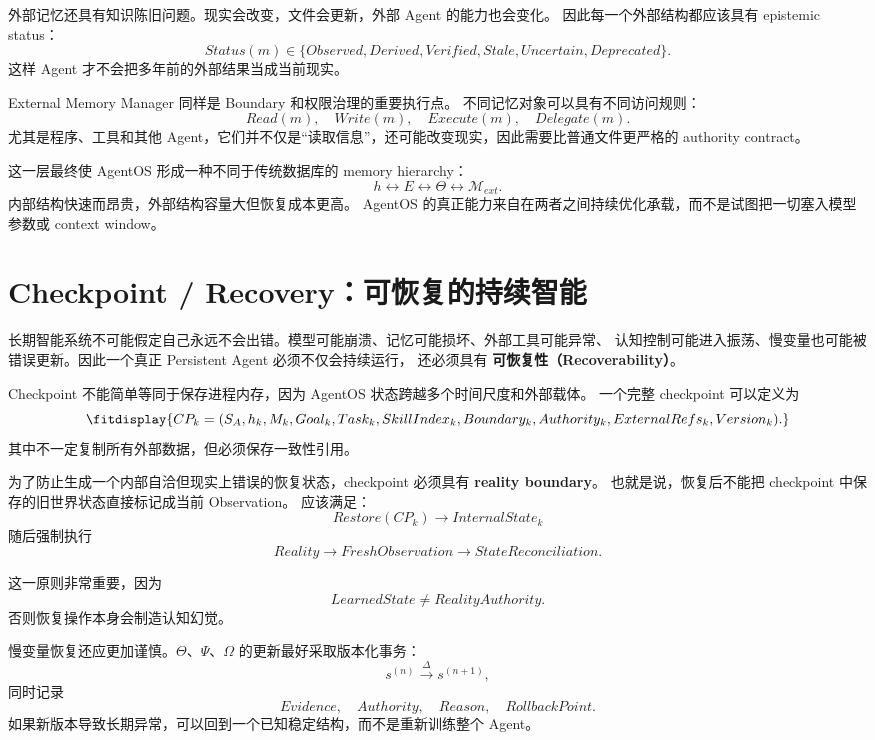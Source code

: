 外部记忆还具有知识陈旧问题。现实会改变，文件会更新，外部 Agent 的能力也会变化。
因此每一个外部结构都应该具有 epistemic status：
\[
Status(m)
\in
\{
Observed,
Derived,
Verified,
Stale,
Uncertain,
Deprecated
\}.
\]
这样 Agent 才不会把多年前的外部结果当成当前现实。

External Memory Manager 同样是 Boundary 和权限治理的重要执行点。
不同记忆对象可以具有不同访问规则：
\[
Read(m),\quad
Write(m),\quad
Execute(m),\quad
Delegate(m).
\]
尤其是程序、工具和其他 Agent，它们并不仅是``读取信息''，还可能改变现实，因此需要比普通文件更严格的 authority contract。

这一层最终使 AgentOS 形成一种不同于传统数据库的 memory hierarchy：
\[
h
\leftrightarrow
E
\leftrightarrow
\Theta
\leftrightarrow
\mathcal M_{ext}.
\]
内部结构快速而昂贵，外部结构容量大但恢复成本更高。
AgentOS 的真正能力来自在两者之间持续优化承载，而不是试图把一切塞入模型参数或 context window。


\section{Checkpoint / Recovery：可恢复的持续智能}

长期智能系统不可能假定自己永远不会出错。模型可能崩溃、记忆可能损坏、外部工具可能异常、
认知控制可能进入振荡、慢变量也可能被错误更新。因此一个真正 Persistent Agent 必须不仅会持续运行，
还必须具有
\textbf{可恢复性（Recoverability）}。

Checkpoint 不能简单等同于保存进程内存，因为 AgentOS 状态跨越多个时间尺度和外部载体。
一个完整 checkpoint 可以定义为
\[
\fitdisplay{
CP_k=
(
S_A,
h_k,
M_k,
Goal_k,
Task_k,
SkillIndex_k,
Boundary_k,
Authority_k,
ExternalRefs_k,
Version_k
).
}
\]
其中不一定复制所有外部数据，但必须保存一致性引用。

为了防止生成一个内部自洽但现实上错误的恢复状态，checkpoint 必须具有
\textbf{reality boundary}。
也就是说，恢复后不能把 checkpoint 中保存的旧世界状态直接标记成当前 Observation。
应该满足：
\[
Restore(CP_k)
\rightarrow
InternalState_k
\]
随后强制执行
\[
Reality
\rightarrow
FreshObservation
\rightarrow
StateReconciliation.
\]

这一原则非常重要，因为
\[
\boxed{
LearnedState\neq RealityAuthority.
}
\]
否则恢复操作本身会制造认知幻觉。

慢变量恢复还应更加谨慎。$\Theta$、$\Psi$、$\Omega$ 的更新最好采取版本化事务：
\[
s^{(n)}
\xrightarrow{\Delta}
s^{(n+1)},
\]
同时记录
\[
Evidence,\quad
Authority,\quad
Reason,\quad
RollbackPoint.
\]
如果新版本导致长期异常，可以回到一个已知稳定结构，而不是重新训练整个 Agent。

